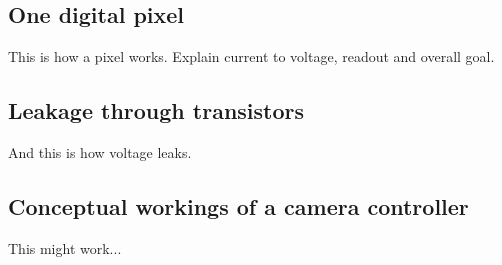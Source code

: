 
\subsection{One digital pixel}

This is how a pixel works.
Explain current to voltage, readout and overall goal.

\subsection{Leakage through transistors}

And this is how voltage leaks.

\subsection{Conceptual workings of a camera controller}

This might work...